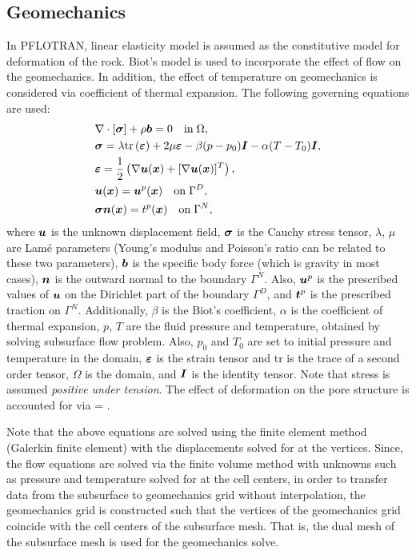\subsection{Geomechanics}
In PFLOTRAN, linear elasticity model is assumed as the constitutive model for deformation of the rock.
Biot's model is used to incorporate the effect of flow on the geomechanics. In addition, the effect of temperature on geomechanics is considered via coefficient of thermal expansion. The following governing equations are used:
\SEQ
\begin{align}
& \nabla \cdot [\boldsymbol{\sigma}] + \rho \boldsymbol{b} = 0 \quad \mathrm{in} \; \Omega, \label{Eq:mom}\\ 
& \boldsymbol{\sigma} = \lambda \text{tr}\left(\boldsymbol{\varepsilon}\right) + 2\mu \boldsymbol{\varepsilon} - \beta (p - p_0) \boldsymbol{I} - \alpha (T - T_0) \boldsymbol{I}, \\
& \boldsymbol{\varepsilon} = \frac{1}{2} \left(\nabla\boldsymbol{u}(\boldsymbol{x}) + [\nabla \boldsymbol{u}(\boldsymbol{x})]^{T}  \right), \\ 
&\boldsymbol{u}(\boldsymbol{x}) = \boldsymbol{u}^p(\boldsymbol{x}) \quad \mathrm{on} \; \Gamma^D,\label{eqn:diri}\\
& \boldsymbol{\sigma}\boldsymbol{n}(\boldsymbol{x}) = t^p(\boldsymbol{x}) \quad \mathrm{on} \; \Gamma^N, \label{eqn:neu}
\end{align}
\SEN
 where $\boldsymbol{u}$ is the unknown displacement field, $\boldsymbol{\sigma}$ is the Cauchy stress tensor,   $\lambda$, $\mu$ are Lam\'{e} parameters (Young's modulus and Poisson's ratio can be related to these two parameters), $\boldsymbol{b}$ is the specific body force (which is gravity in most cases), $\boldsymbol{n}$ is the outward normal to the boundary $\Gamma^N$. Also, $\boldsymbol{u}^p$ is the prescribed values of $\boldsymbol{u}$ on the Dirichlet part of the boundary $\Gamma^D$, and $\boldsymbol{t}^p$ is the prescribed traction on $\Gamma^N$. Additionally, $\beta$ is the Biot's coefficient, $\alpha$ is the coefficient of thermal expansion, $p$, $T$ are the fluid pressure and temperature, obtained by solving subsurface flow problem. Also, $p_0$ and $T_0$ are set to initial  pressure and temperature in the domain, $\boldsymbol{\varepsilon}$ is the strain tensor and $\text{tr}$ is the trace of a second order tensor, $\Omega$ is the domain, and $\boldsymbol{I}$ is the identity tensor. Note that stress is assumed \textit{positive under tension}.
The effect of deformation on the pore structure is accounted for via 
\BA
\phi = .
\EA

Note that the above equations are solved using the finite element method (Galerkin finite element) with the displacements solved for at the vertices. Since, the flow equations are solved via the finite volume method with unknowns such as pressure and temperature solved for at the cell centers, in order to transfer data from the subsurface to geomechanics grid without interpolation, the geomechanics grid is constructed such that the vertices of the geomechanics grid coincide with the cell centers of the subsurface mesh. That is, the dual mesh of the subsurface mesh is used for the geomechanics solve.

